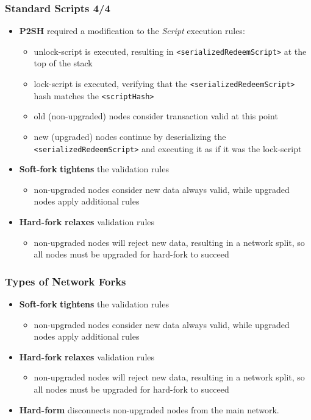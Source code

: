 \documentclass{beamer}
\begin{document}
\begin{frame}[fragile]
  \frametitle{Standard Scripts 4/4}
  \begin{itemize}
  \item \textbf{P2SH} required a modification to the \textit{Script} execution
    rules:
    \begin{itemize}
    \item unlock-script is executed, resulting in
      \texttt{<serializedRedeemScript>} at the top of the stack
    \item lock-script is executed, verifying that the
      \texttt{<serializedRedeemScript>} hash matches the
      \texttt{<scriptHash>}
    \item old (non-upgraded) nodes consider transaction valid at this point
    \item new (upgraded) nodes continue by deserializing the
      \texttt{<serializedRedeemScript>} and executing it as if it
      was the lock-script
    \end{itemize}
  \item \textbf{Soft-fork} \textbf{tightens} the validation rules
    \begin{itemize}
    \item non-upgraded nodes consider new data always valid, while upgraded
      nodes apply additional rules
    \end{itemize}
  \item \textbf{Hard-fork} \textbf{relaxes} validation rules
    \begin{itemize}
    \item non-upgraded nodes will reject new data, resulting in a network split,
      so all nodes must be upgraded for hard-fork to succeed
    \end{itemize}
  \end{itemize}
\end{frame}

\begin{frame}[fragile]
  \frametitle{Types of Network Forks}
  \begin{itemize}
  \item \textbf{Soft-fork} \textbf{tightens} the validation rules
    \begin{itemize}
    \item non-upgraded nodes consider new data always valid, while upgraded
      nodes apply additional rules
    \end{itemize}
  \item \textbf{Hard-fork} \textbf{relaxes} validation rules
    \begin{itemize}
    \item non-upgraded nodes will reject new data, resulting in a network split,
      so all nodes must be upgraded for hard-fork to succeed
    \end{itemize}
  \item \textbf{Hard-form} disconnects non-upgraded nodes from the main network.
  \end{itemize}
\end{frame}
\end{document}
